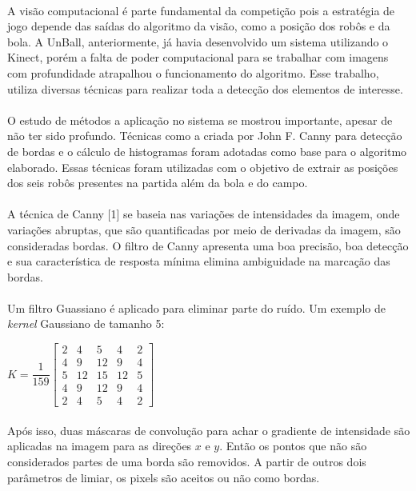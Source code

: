 \documentclass[conference, harvard, brazil, english]{sbatex}
\begin{document}
		\paragraph{}
		A visão computacional é parte fundamental da competição pois a estratégia de jogo depende das saídas do algoritmo da visão, como a posição dos robôs e da bola. A UnBall, anteriormente, já havia desenvolvido um sistema utilizando o Kinect, porém a falta de poder computacional para se trabalhar com imagens com profundidade atrapalhou o funcionamento do algoritmo. Esse trabalho, utiliza diversas técnicas para realizar toda a detecção dos elementos de interesse.
		\paragraph{}
		O estudo de métodos a aplicação no sistema se mostrou importante, apesar de não ter sido profundo. Técnicas como a criada por John F. Canny para detecção de bordas e o cálculo de histogramas foram adotadas como base para o algoritmo elaborado. Essas técnicas foram utilizadas com o objetivo de extrair as posições dos seis robôs presentes na partida além da bola e do campo.
		\paragraph{}
		A técnica de Canny [1] se baseia nas variações de intensidades da imagem, onde variações abruptas, que são quantificadas por meio de derivadas da imagem, são consideradas bordas. O filtro de Canny apresenta uma boa precisão, boa detecção e sua característica de resposta mínima elimina ambiguidade na marcação das bordas.
		\paragraph{}
		Um filtro Guassiano é aplicado para eliminar parte do ruído. Um exemplo de \textit{kernel} Gaussiano de tamanho 5:
		\begin{center}
			$ K = \dfrac{1}{159}\begin{bmatrix} 
			2 & 4 & 5 & 4 & 2 \\
			4 & 9 & 12 & 9 & 4 \\
			5 & 12 & 15 & 12 & 5 \\
			4 & 9 & 12 & 9 & 4 \\
			2 & 4 & 5 & 4 & 2
			\end{bmatrix}$
		\end{center}
		\paragraph{}
		Após isso, duas máscaras de convolução para achar o gradiente de intensidade são aplicadas na imagem para as direções $x$ e $y$. Então os pontos que não são considerados partes de uma borda são removidos. A partir de outros dois parâmetros de limiar, os pixels são aceitos ou não como bordas.
\end{document}
